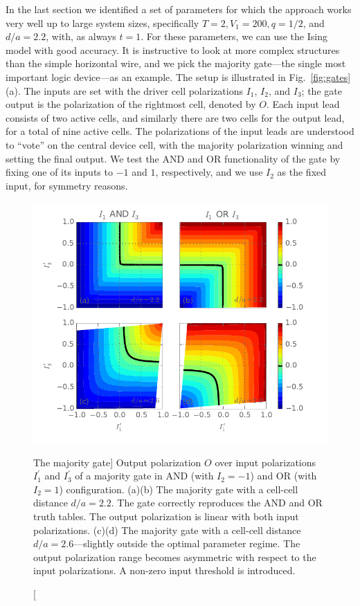 In the last section we identified a set of parameters for which the 
approach works very well up to large system sizes, specifically $T = 2, V_1 =
200, q = 1/2$, and $d/a = 2.2$, with, as always $t = 1$. For these parameters,
we can use the Ising model with good accuracy. It is instructive to look at more
complex  structures than the simple horizontal wire, and we pick the
majority gate---the single most important  logic device---as an
example. The setup is illustrated in Fig.~\ref{fig:gates}(a). The inputs are set
with the driver cell polarizations $I_1$, $I_2$, and $I_3$; the gate output is
the polarization of the rightmost cell, denoted by $O$. Each input lead consists
of two active cells, and similarly there are two cells for the output lead, for
a total of nine active cells. The polarizations of the input leads are
understood to ``vote'' on the central device cell, with the majority
polarization winning and setting the final output. We test the AND and OR
functionality of the gate by fixing one of its inputs to $-1$ and $1$,
respectively, and we use $I_2$ as the fixed input, for symmetry reasons.

\begin{figure}
  \center
  \includegraphics{majority_gate_contour}
  \caption
  [The majority gate]
  {
  \label{fig:majority_gate_contour}
  Output polarization $O$ over input polarizations $I_1^{\prime}$ and
  $I_3^{\prime}$ of a majority gate in AND (with $I_2 = -1$) and OR (with $I_2 =
  1$) configuration. (a)(b) The majority gate with a cell-cell distance $d/a =
  2.2$. The gate correctly reproduces the AND and OR truth tables. The output
  polarization is linear with both input polarizations. (c)(d) The majority gate with
  a cell-cell distance $d/a = 2.6$---slightly outside the optimal parameter
  regime. The output polarization range becomes asymmetric with respect to the
  input polarizations. A non-zero input threshold is introduced.
  }
\end{figure}

